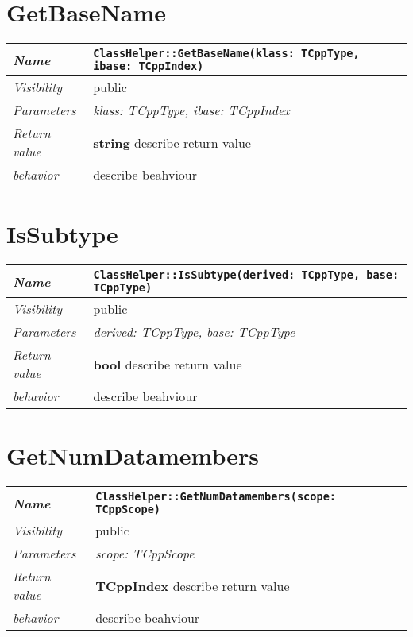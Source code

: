  \section{GetBaseName}
\begin{longtable}{p{3cm} @{\hskip 1cm} p{12cm}}
 \hline
\textit{Name} & \texttt{ClassHelper::GetBaseName(klass: TCppType, ibase: TCppIndex)}\\
\hline
 \textit{Visibility} & public\\
\hline
\textit{Parameters} & \textit{klass: TCppType, ibase: TCppIndex}\\
\hline
\textit{Return value} & \textbf{ string} describe return value\\
  \hline
 \textit{behavior} & describe beahviour \\
\hline
\end{longtable} \pagebreak
 \section{IsSubtype}
\begin{longtable}{p{3cm} @{\hskip 1cm} p{12cm}}
 \hline
\textit{Name} & \texttt{ClassHelper::IsSubtype(derived: TCppType, base: TCppType)}\\
\hline
 \textit{Visibility} & public\\
\hline
\textit{Parameters} & \textit{derived: TCppType, base: TCppType}\\
\hline
\textit{Return value} & \textbf{ bool} describe return value\\
  \hline
 \textit{behavior} & describe beahviour \\
\hline
\end{longtable} \pagebreak
 \section{GetNumDatamembers}
\begin{longtable}{p{3cm} @{\hskip 1cm} p{12cm}}
 \hline
\textit{Name} & \texttt{ClassHelper::GetNumDatamembers(scope: TCppScope)}\\
\hline
 \textit{Visibility} & public\\
\hline
\textit{Parameters} & \textit{scope: TCppScope}\\
\hline
\textit{Return value} & \textbf{ TCppIndex} describe return value\\
  \hline
 \textit{behavior} & describe beahviour \\
\hline
\end{longtable} \pagebreak
